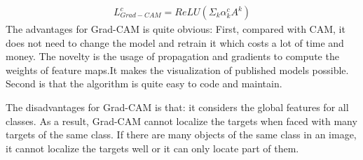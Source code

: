 \documentclass[conference]{IEEEtran}
\begin{document}
  \begin{equation}
  \begin{aligned}
      L_{Grad-CAM}^{c}=ReLU(\Sigma_{k}\alpha_{k}^{c}A^{k})
      \label{Grad-CAM_weight}
  \end{aligned}
\end{equation}
The advantages for Grad-CAM is quite obvious: First, compared with CAM, it does not need to change the model and retrain it which costs a lot of time and money. 
The novelty is the usage of propagation and gradients to compute the weights of feature maps.It makes the visualization of published models possible. Second is that the algorithm is quite easy to code and maintain.\par
The disadvantages for Grad-CAM is that: it considers the global features for all classes. As a result, Grad-CAM cannot localize the targets when faced with many targets of the same class. If there are many objects of the same class in an image, it cannot localize the targets well or it can only locate part of them.
\end{document}
